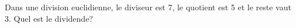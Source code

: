 %
%
Dans une division euclidienne, le diviseur est 7, le quotient est 5 et le reste vaut 3. Quel est le dividende? \\
